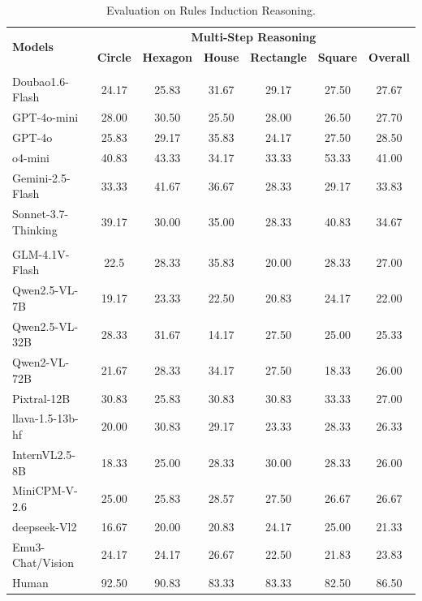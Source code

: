 \documentclass{article}
\begin{document}
\begin{table}[b]
\setlength{\tabcolsep}{0.3mm} 
\centering
\begin{tabular}{l|cccccc}
\toprule
\multirow{2}{*}{\textbf{Models}} & \multicolumn{6}{c}{\textbf{Multi-Step Reasoning}} \\
 & \textbf{Circle} & \textbf{Hexagon} & \textbf{House} & \textbf{Rectangle} & \textbf{Square} & \textbf{Overall} \\
\midrule
\rowcolor{yellow!20}\multicolumn{7}{l}{\textbf{\textit{Proprietary}}} \\
Doubao1.6-Flash &24.17 &25.83 &31.67 &29.17 &27.50 &27.67 \\
GPT-4o-mini &28.00 &30.50 &25.50 &28.00 &26.50 &27.70 \\
GPT-4o & 25.83 &29.17 & 35.83 &24.17 &27.50 &28.50 \\
o4-mini & \cellcolor{gray!30}40.83 &\cellcolor{gray!30}43.33 & 34.17 &\cellcolor{gray!30}33.33 &\cellcolor{gray!30}53.33&\cellcolor{gray!30}41.00 \\
Gemini-2.5-Flash &33.33 &41.67 &\cellcolor{gray!30}36.67 &28.33 &29.17 &33.83 \\
Sonnet-3.7-Thinking &39.17 &30.00 & 35.00 &28.33 &40.83 &34.67\\
\midrule
\rowcolor{yellow!20}\multicolumn{7}{l}{\textbf{\textit{Open-source}}} \\
GLM-4.1V-Flash & 22.5 & 28.33 & 35.83 & 20.00 & 28.33 & 27.00 \\
Qwen2.5-VL-7B &19.17 &23.33 &22.50& 20.83 &24.17 & 22.00\\
Qwen2.5-VL-32B &28.33 &31.67 &14.17 & 27.50 &25.00 & 25.33\\
Qwen2-VL-72B &21.67 &28.33 &34.17 &27.50 &18.33 & 26.00 \\
Pixtral-12B &30.83 & 25.83& 30.83& 30.83 &33.33 & 27.00\\
llava-1.5-13b-hf &20.00 &30.83 & 29.17&23.33 &28.33 & 26.33 \\
InternVL2.5-8B & 18.33& 25.00&28.33 & 30.00 &28.33 &26.00\\
MiniCPM-V-2.6 & 25.00& 25.83 &28.57& 27.50 &26.67 & 26.67\\
deepseek-Vl2 &16.67&20.00&20.83&24.17&25.00&21.33\\
Emu3-Chat/Vision &24.17&24.17&26.67&22.50&21.83&23.83\\
\midrule
Human&\cellcolor{gray!30}92.50&\cellcolor{gray!30}90.83&\cellcolor{gray!30}83.33&\cellcolor{gray!30}83.33&\cellcolor{gray!30}82.50&\cellcolor{gray!30}86.50\\
\bottomrule
\end{tabular}
\caption{Evaluation on Rules Induction Reasoning.}
\label{tab:rules induction}
\end{table}
\end{document}
